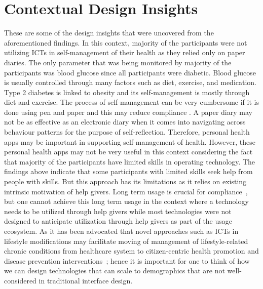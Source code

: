 \section{Contextual Design Insights}
These are some of the design insights that were uncovered from the aforementioned findings. In this context, majority of the participants were not utilizing ICTs in self-management of their health as they relied only on paper diaries. The only parameter that was being monitored by majority of the participants was blood glucose since all participants were diabetic. Blood glucose is usually controlled through many factors such as diet, exercise, and medication. Type 2 diabetes is linked to obesity and its self-management is mostly through diet and exercise.  The process of self-management can be very cumbersome if it is done using pen and paper and this may reduce compliance \citep{mattila2008mobile}. A paper diary may not be as effective as an electronic diary when it comes into navigating across behaviour patterns for the purpose of self-reflection. Therefore, personal health apps may be important in supporting self-management of health. However, these personal health apps may not be very useful in this context considering the fact that majority of the participants have limited skills in operating technology. The findings above indicate that some participants with limited skills seek help from people with skills. But this approach has its limitations as it relies on existing intrinsic motivation of help givers. Long term usage is crucial for compliance~\citep{mattila2008mobile}, but one cannot achieve this long term usage in the context where a technology needs to be utilized through help givers while most technologies were not designed to anticipate utilization through help givers as part of the usage ecosystem. As it has been advocated that novel approaches such as ICTs in lifestyle modifications may facilitate moving of management of lifestyle-related chronic conditions from healthcare system to citizen-centric health promotion and disease prevention interventions~\citep{korhonen2010personal}; hence it is important for one to think of how we can design technologies that can scale to demographics that are not well-considered in traditional interface design. 

